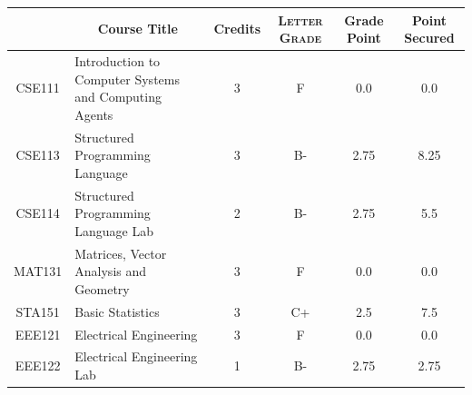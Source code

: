 \documentclass[11pt]{article}
\newcommand*{\numtwo}[1]{\pgfmathprintnumber[
                    fixed, precision=2, fixed zerofill=true]{#1}}
\begin{document}
                \begin{center}
                    \renewcommand{\arraystretch}{1.08}
                    
                \begin{tabular}{|c|l|c|>{\scshape}c|c|c|}
                \hline  \rule[-1ex]{0pt}{3.5ex} {\centering{\bf Course Code}} &  \multicolumn{1}{c|}{\textbf{Course Title}}  & {\bf Credits} & {\bf Letter Grade} & {\bf Grade Point} & {\bf Point Secured}  \\ 
                \hline   CSE111 &  Introduction to Computer Systems and Computing Agents		 & 3 & F & 0.0 & 0.0 \\ %
                \hline   CSE113 &  Structured Programming Language		 & 3 & B- & 2.75 & 8.25 \\ %
                \hline   CSE114 &  Structured Programming Language Lab		 & 2 & B- & 2.75 & 5.5 \\ %
                \hline   MAT131 &  Matrices, Vector Analysis and Geometry		 & 3 & F & 0.0 & 0.0 \\ %
                \hline   STA151 &  Basic Statistics		 & 3 & C+ & 2.5 & 7.5 \\ %
                \hline   EEE121 &  Electrical Engineering		 & 3 & F & 0.0 & 0.0 \\ %
                \hline   EEE122 &  Electrical Engineering Lab		 & 1 & B- & 2.75 & 2.75 \\ %

\hline                %
                \end{tabular}
                \end{center}
                \renewcommand{\arraystretch}{1.03}
\end{document}
